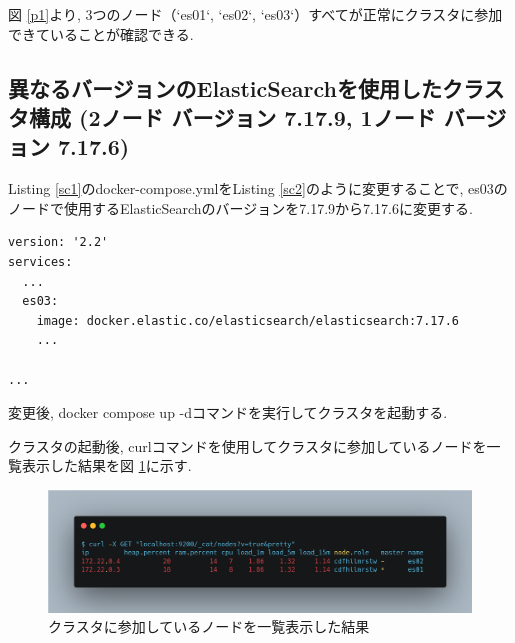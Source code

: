 \documentclass[a4j,12pt,]{jarticle}
\begin{document}

図 \ref{p1}より, 3つのノード（`es01`, `es02`, `es03`）すべてが正常にクラスタに参加できていることが確認できる.

\subsection{異なるバージョンのElasticSearchを使用したクラスタ構成 (2ノード バージョン 7.17.9, 1ノード バージョン 7.17.6)}

Listing \ref{sc1}のdocker-compose.ymlをListing \ref{sc2}のように変更することで, es03のノードで使用するElasticSearchのバージョンを7.17.9から7.17.6に変更する.

\begin{lstlisting}[caption=Listing \ref{sc1}のdocker-compose.ymlから変更を加えた箇所, label=sc2]
version: '2.2'
services:
  ...
  es03:
    image: docker.elastic.co/elasticsearch/elasticsearch:7.17.6
    ...

...
\end{lstlisting}

変更後, docker compose up -dコマンドを実行してクラスタを起動する.

クラスタの起動後, curlコマンドを使用してクラスタに参加しているノードを一覧表示した結果を図 \ref{p2}に示す.

\begin{figure}[H]
  \begin{center}
    \includegraphics[width=160mm]{curl-different.png}
    \caption{クラスタに参加しているノードを一覧表示した結果}
    \label{p2}
  \end{center}
\end{figure}
\end{document}
